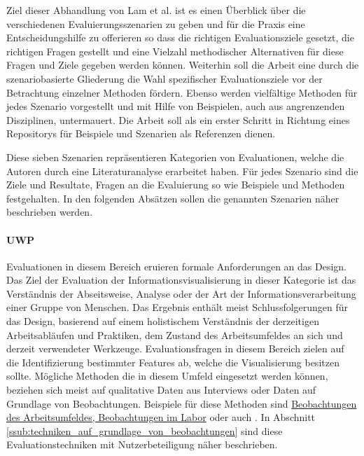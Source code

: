 \documentclass[draft=false
              ,paper=a4
              ,twoside=false
              ,fontsize=11pt
              ,headsepline
              ,BCOR10mm
              ,DIV11
              ]{scrbook}
\begin{document}
Ziel dieser Abhandlung von Lam et al. ist es einen Überblick über die verschiedenen Evaluierungsszenarien zu geben und für die Praxis eine Entscheidungshilfe zu offerieren so dass die richtigen Evaluationsziele gesetzt, die richtigen Fragen gestellt und eine Vielzahl methodischer Alternativen für diese Fragen und Ziele gegeben werden können. Weiterhin soll die Arbeit eine durch die szenariobasierte Gliederung die Wahl spezifischer Evaluationsziele vor der Betrachtung einzelner Methoden fördern. Ebenso werden vielfältige Methoden für jedes Szenario vorgestellt und mit Hilfe von Beispielen, auch aus angrenzenden Disziplinen, untermauert. Die Arbeit soll als ein erster Schritt in Richtung eines Repositorys für Beispiele und Szenarien als Referenzen dienen. 

Diese sieben Szenarien repräsentieren Kategorien von Evaluationen, welche die Autoren durch eine Literaturanalyse erarbeitet haben. Für jedes Szenario sind die Ziele und Resultate, Fragen an die Evaluierung so wie Beispiele und Methoden festgehalten. In den folgenden Absätzen sollen die genannten Szenarien näher beschrieben werden.

\paragraph{UWP} %
\label{par:uwp}
Evaluationen in diesem Bereich eruieren formale Anforderungen an das Design. Das Ziel der Evaluation der Informationsvisualisierung in dieser Kategorie ist das Verständnis der Abseitsweise, Analyse oder der Art der Informationsverarbeitung einer Gruppe von Menschen. Das Ergebnis enthält meist Schlussfolgerungen für das Design, basierend auf einem holistischem Verständnis der derzeitigen Arbeitsabläufen und Praktiken, dem Zustand des Arbeitsumfeldes an sich und derzeit verwendeter Werkzeuge. Evaluationsfragen in diesem Bereich zielen auf die Identifizierung bestimmter Features ab, welche die Visualisierung besitzen sollte.
Mögliche Methoden die in diesem Umfeld eingesetzt werden können, beziehen sich meist auf qualitative Daten aus Interviews oder Daten auf Grundlage von Beobachtungen. Beispiele für diese Methoden sind \hyperref[ssub:techniken_auf_grundlage_von_beobachtungen]{Beobachtungen des Arbeitsumfeldes, Beobachtungen im Labor} oder auch . In Abschnitt \ref{ssub:techniken_auf_grundlage_von_beobachtungen} sind diese Evaluationstechniken mit Nutzerbeteiligung näher beschrieben. 
\end{document}
